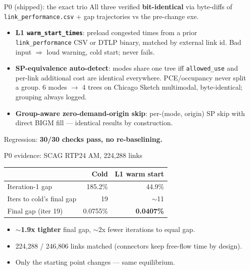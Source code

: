 \documentclass[10pt]{beamer}
\newcommand{\code}[1]{\texttt{#1}}
\begin{document}
\begin{frame}{P0 (shipped): the exact trio}
  All three verified \textbf{bit-identical} via byte-diffs of
  \code{link\_performance.csv} + gap trajectories vs the pre-change exe.
  \begin{itemize}
    \item \textbf{L1 \code{warm\_start\_times}}: preload congested times from a
      prior \code{link\_performance} CSV or DTLP binary, matched by external
      link id. Bad input $\Rightarrow$ loud warning, cold start; never fails.
    \item \textbf{SP-equivalence auto-detect}: modes share one tree iff
      \code{allowed\_use} and per-link additional cost are identical everywhere.
      PCE/occupancy never split a group. 6 modes $\to$ 4 trees on Chicago
      Sketch multimodal, byte-identical; grouping always logged.
    \item \textbf{Group-aware zero-demand-origin skip}: per-(mode, origin) SP
      skip with direct BIGM fill --- identical results by construction.
  \end{itemize}
  \medskip
  Regression: \textbf{30/30 checks pass, no re-baselining.}
\end{frame}

\begin{frame}{P0 evidence: SCAG RTP24 AM, 224{,}288 links}
  \begin{table}
  \centering
  \begin{tabular}{lrr}
    \toprule
     & Cold & L1 warm start \\
    \midrule
    Iteration-1 gap          & 185.2\%   & 44.9\% \\
    Iters to cold's final gap & 19       & $\sim$11 \\
    Final gap (iter 19)      & 0.0755\%  & \textbf{0.0407\%} \\
    \bottomrule
  \end{tabular}
  \end{table}
  \begin{itemize}
    \item $\sim$\textbf{1.9x tighter} final gap, $\sim$2x fewer iterations to
      equal gap.
    \item 224{,}288 / 246{,}806 links matched (connectors keep free-flow time
      by design).
    \item Only the starting point changes --- same equilibrium.
  \end{itemize}
\end{frame}
\end{document}

